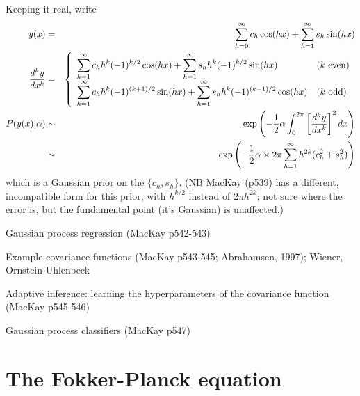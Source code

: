 \documentclass{beamer}
\begin{document}
\begin{frame}{}
Keeping it real, write
\begin{eqnarray*}
y(x) & = & \sum_{h=0}^\infty c_h \cos(hx) + \sum_{h=1}^\infty s_h \sin(hx) \\
\frac{d^{k} {y}}{d {x}^{k}} & = & \left\{ \begin{array}{ll}
\displaystyle
\sum_{h=1}^\infty c_h h^k (-1)^{k/2} \cos(hx) + \sum_{h=1}^\infty s_h h^k (-1)^{k/2} \sin(hx) & \mbox{($k$ even)} \\
\displaystyle
\sum_{h=1}^\infty c_h h^k (-1)^{(k+1)/2} \sin(hx) + \sum_{h=1}^\infty s_h h^k (-1)^{(k-1)/2} \cos(hx) & \mbox{($k$ odd)}
\end{array} \right. \\
P(y(x)|\alpha) & \sim & \exp \left( -\frac{1}{2}\alpha\int_0^{2\pi} \left[ \frac{d^{k} {y}}{d {x}^{k}} \right]^2 dx \right) \\
& \sim & \exp \left( -\frac{1}{2} \alpha \times 2\pi \sum_{h=1}^{\infty} h^{2k} (c_h^2 + s_h^2) \right)
\end{eqnarray*}
which is a Gaussian prior on the $\{ c_h, s_h \}$.
(NB MacKay (p539) has a different, incompatible form for this prior, with $h^{k/2}$ instead of $2\pi h^{2k}$;
not sure where the error is, but the fundamental point (it's Gaussian) is unaffected.)
\item Gaussian process regression (MacKay p542-543)
\item Example covariance functions (MacKay p543-545; Abrahamsen, 1997); Wiener, Ornstein-Uhlenbeck
\item Adaptive inference: learning the hyperparameters of the covariance function (MacKay p545-546)
\item Gaussian process classifiers (MacKay p547)
\iteme

\end{frame}

\section{The Fokker-Planck equation}
\end{document}
